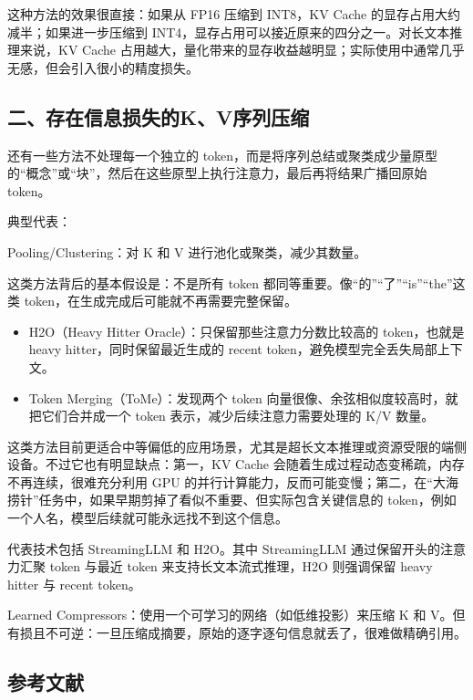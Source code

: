这种方法的效果很直接：如果从 FP16 压缩到 INT8，KV Cache 的显存占用大约减半；如果进一步压缩到 INT4，显存占用可以接近原来的四分之一。对长文本推理来说，KV Cache 占用越大，量化带来的显存收益越明显；实际使用中通常几乎无感，但会引入很小的精度损失。

\hypertarget{ux4e8cux5b58ux5728ux4fe1ux606fux635fux5931ux7684kvux5e8fux5217ux538bux7f29}{%
\subsection{二、存在信息损失的K、V序列压缩}\label{ux4e8cux5b58ux5728ux4fe1ux606fux635fux5931ux7684kvux5e8fux5217ux538bux7f29}}

还有一些方法不处理每一个独立的 token，而是将序列总结或聚类成少量原型的``概念''或``块''，然后在这些原型上执行注意力，最后再将结果广播回原始 token。

典型代表：

Pooling/Clustering：对 K 和 V 进行池化或聚类，减少其数量。

这类方法背后的基本假设是：不是所有 token 都同等重要。像``的''``了''``is''``the''这类 token，在生成完成后可能就不再需要完整保留。

\begin{itemize}
\tightlist
\item
  H2O（Heavy Hitter Oracle）：只保留那些注意力分数比较高的 token，也就是 heavy hitter，同时保留最近生成的 recent token，避免模型完全丢失局部上下文。
\item
  Token Merging（ToMe）：发现两个 token 向量很像、余弦相似度较高时，就把它们合并成一个 token 表示，减少后续注意力需要处理的 K/V 数量。
\end{itemize}

这类方法目前更适合中等偏低的应用场景，尤其是超长文本推理或资源受限的端侧设备。不过它也有明显缺点：第一，KV Cache 会随着生成过程动态变稀疏，内存不再连续，很难充分利用 GPU 的并行计算能力，反而可能变慢；第二，在``大海捞针''任务中，如果早期剪掉了看似不重要、但实际包含关键信息的 token，例如一个人名，模型后续就可能永远找不到这个信息。

代表技术包括 StreamingLLM 和 H2O。其中 StreamingLLM 通过保留开头的注意力汇聚 token 与最近 token 来支持长文本流式推理，H2O 则强调保留 heavy hitter 与 recent token。

Learned Compressors：使用一个可学习的网络（如低维投影）来压缩 K 和 V。但有损且不可逆：一旦压缩成摘要，原始的逐字逐句信息就丢了，很难做精确引用。

\hypertarget{ux53c2ux8003ux6587ux732e-95}{%
\subsection{参考文献}\label{ux53c2ux8003ux6587ux732e-95}}

